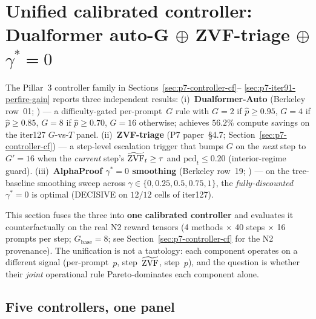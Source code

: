 \section{Unified calibrated controller: Dualformer auto-G \texorpdfstring{$\oplus$}{+} ZVF-triage \texorpdfstring{$\oplus$}{+} \texorpdfstring{$\gamma^*{=}0$}{}}
\label{sec:p7-iter103-unified-controller}

The Pillar~3 controller family in Sections~\ref{sec:p7-controller-cf}--%
\ref{sec:p7-iter91-perfire-gain} reports three independent results:
(i)~\textbf{Dualformer-Auto} (Berkeley row~01; \citet{su2024dualformer}) ---
a difficulty-gated per-prompt~$G$ rule with $G{=}2$ if $\hat p{\ge}0.95$,
$G{=}4$ if $\hat p{\ge}0.85$, $G{=}8$ if $\hat p{\ge}0.70$, $G{=}16$
otherwise; achieves $56.2\%$ compute savings on the iter127
$G$-vs-$T$ panel.
(ii)~\textbf{ZVF-triage} (P7 paper~\S4.7; Section~\ref{sec:p7-controller-cf})
--- a step-level escalation trigger that bumps $G$ on the \emph{next}
step to $G'{=}16$ when the \emph{current} step's $\widetilde{\mathrm{ZVF}}_t \ge \tau$ and
$\mathrm{pcd}_t \le 0.20$ (interior-regime guard).
(iii)~\textbf{AlphaProof $\gamma^*{=}0$ smoothing} (Berkeley row~19;
\citet{alphaproof2025nature}) --- on the tree-baseline smoothing sweep
across $\gamma \in \{0, 0.25, 0.5, 0.75, 1\}$, the \emph{fully-discounted}
$\gamma^*{=}0$ is optimal (DECISIVE on $12/12$ cells of iter127).

This section fuses the three into \textbf{one calibrated controller}
and evaluates it counterfactually on the real N2 reward tensors
(4 methods $\times$ 40 steps $\times$ 16 prompts per step;
$G_{\mathrm{base}}{=}8$; see Section~\ref{sec:p7-controller-cf} for the
N2 provenance).  The unification is not a tautology: each component
operates on a different signal (per-prompt~$p$, step~$\widetilde{\mathrm{ZVF}}$, step~$p$),
and the question is whether their \emph{joint} operational rule Pareto-dominates
each component alone.

\subsection{Five controllers, one panel}

